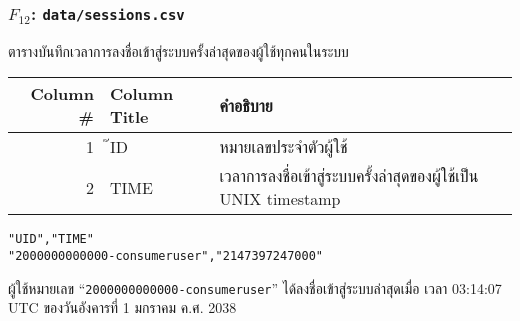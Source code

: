 \begin{minipage}{\textwidth}
\subsubsection{\texorpdfstring{$ F_{12} $}{File \#12}: \texttt{data/sessions.csv}}\label{subsubsec:csv-f12}

ตารางบันทึกเวลาการลงชื่อเข้าสู่ระบบครั้งล่าสุดของผู้ใช้ทุกคนในระบบ

\begin{tabular}[!hbt]{| r | >{\ttfamily}p{15ex}<{\rmfamily} | p{36ex} |}
\hline
Column \#       & \rmfamily Column Title                & คำอธิบาย\\
\hline
1               & ๊ID                                    & หมายเลขประจำตัวผู้ใช้\\
2               & TIME                                  & เวลาการลงชื่อเข้าสู่ระบบครั้งล่าสุดของผู้ใช้เป็น UNIX timestamp\\
\hline
\end{tabular}


\begin{lstlisting}[caption={\texttt{data/sessions.csv}}]
"UID","TIME"
"2000000000000-consumeruser","2147397247000"
\end{lstlisting}

\begin{description}[labelwidth=*]
    \item[$ \Rightarrow $] ผู้ใช้หมายเลข ``\texttt{2000000000000-consumeruser}'' ได้ลงชื่อเข้าสู่ระบบล่าสุดเมื่อ
เวลา 03:14:07 UTC ของวันอังคารที่ 1 มกราคม ค.ศ. 2038
\end{description}
\end{minipage}


\vspace{3\baselineskip}


